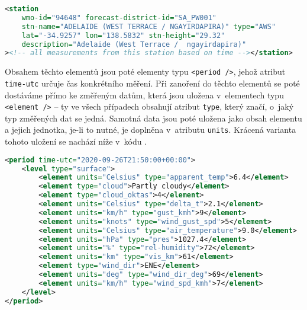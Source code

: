 \documentclass[10pt,a4paper,titlepage]{extarticle}
\begin{document}
\begin{lstlisting}[language=XML,caption={Ukázka způsobu uložení informací týkajících se konkrétní stanice.},
label=lst:station-example]
<station
    wmo-id="94648" forecast-district-id="SA_PW001"
    stn-name="ADELAIDE (WEST TERRACE / NGAYIRDAPIRA)" type="AWS"
    lat="-34.9257" lon="138.5832" stn-height="29.32"
    description="Adelaide (West Terrace /  ngayirdapira)"
><!-- all measurements from this station based on time --></station>\end{lstlisting}
Obsahem těchto elementů jsou poté elementy typu \texttt{<period />}, jehož atribut \texttt{time-utc} určuje čas
konkrétního měření. Při zanoření do těchto elementů se poté dostáváme přímo ke změřeným datům, která jsou uložena
v~elementech typu \texttt{<element />} -- ty ve všech případech obsahují atribut \texttt{type}, který značí, o~jaký typ
změřených dat se jedná. Samotná data jsou poté uložena jako obsah elementu a jejich jednotka, je-li to nutné, je
doplněna v~atributu \texttt{units}. Krácená varianta tohoto uložení se nachází níže v~kódu
.
\begin{lstlisting}[language=XML,caption={Ukázka uložení meteorologických dat změřených v~\textit{21:50:00 UTC 26.9
.2020}}, label=lst:measurement-example]
<period time-utc="2020-09-26T21:50:00+00:00">
    <level type="surface">
        <element units="Celsius" type="apparent_temp">6.4</element>
        <element type="cloud">Partly cloudy</element>
        <element type="cloud_oktas">4</element>
        <element units="Celsius" type="delta_t">2.1</element>
        <element units="km/h" type="gust_kmh">9</element>
        <element units="knots" type="wind_gust_spd">5</element>
        <element units="Celsius" type="air_temperature">9.0</element>
        <element units="hPa" type="pres">1027.4</element>
        <element units="%" type="rel-humidity">72</element>
        <element units="km" type="vis_km">61</element>
        <element type="wind_dir">ENE</element>
        <element units="deg" type="wind_dir_deg">69</element>
        <element units="km/h" type="wind_spd_kmh">7</element>
    </level>
</period>\end{lstlisting}%
\end{document}
